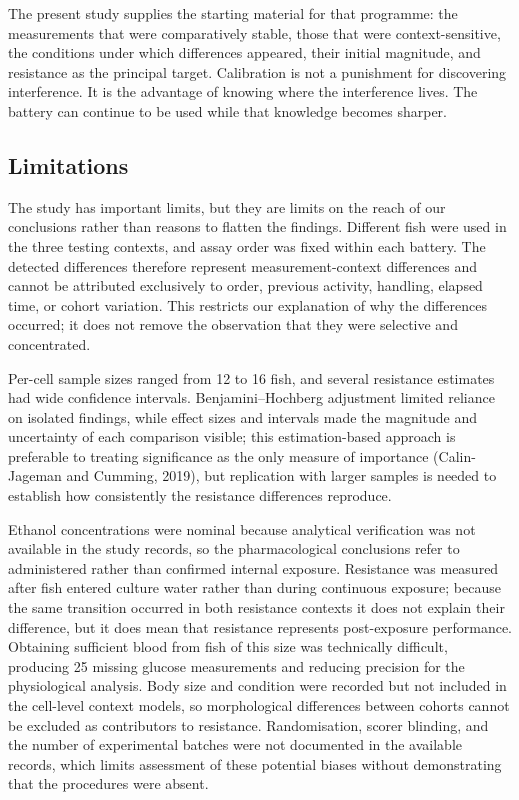 \documentclass[12pt,a4paper]{article}
\begin{document}
The present study supplies the starting material for that programme: the measurements that were comparatively stable, those that were context-sensitive, the conditions under which differences appeared, their initial magnitude, and resistance as the principal target. Calibration is not a punishment for discovering interference. It is the advantage of knowing where the interference lives. The battery can continue to be used while that knowledge becomes sharper.

\subsection{Limitations}

The study has important limits, but they are limits on the reach of our conclusions rather than reasons to flatten the findings. Different fish were used in the three testing contexts, and assay order was fixed within each battery. The detected differences therefore represent measurement-context differences and cannot be attributed exclusively to order, previous activity, handling, elapsed time, or cohort variation. This restricts our explanation of why the differences occurred; it does not remove the observation that they were selective and concentrated.

Per-cell sample sizes ranged from 12 to 16 fish, and several resistance estimates had wide confidence intervals. Benjamini--Hochberg adjustment limited reliance on isolated findings, while effect sizes and intervals made the magnitude and uncertainty of each comparison visible; this estimation-based approach is preferable to treating significance as the only measure of importance (Calin-Jageman and Cumming, 2019), but replication with larger samples is needed to establish how consistently the resistance differences reproduce.

Ethanol concentrations were nominal because analytical verification was not available in the study records, so the pharmacological conclusions refer to administered rather than confirmed internal exposure. Resistance was measured after fish entered culture water rather than during continuous exposure; because the same transition occurred in both resistance contexts it does not explain their difference, but it does mean that resistance represents post-exposure performance. Obtaining sufficient blood from fish of this size was technically difficult, producing 25 missing glucose measurements and reducing precision for the physiological analysis. Body size and condition were recorded but not included in the cell-level context models, so morphological differences between cohorts cannot be excluded as contributors to resistance. Randomisation, scorer blinding, and the number of experimental batches were not documented in the available records, which limits assessment of these potential biases without demonstrating that the procedures were absent.
\end{document}
